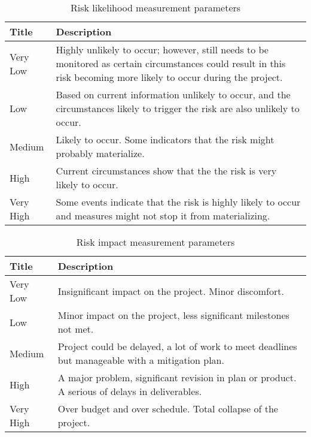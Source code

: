 \begin{center}
    \begin{table}[htb]
    \begin{tabular}{ | l | p{10cm} |}

    \hline
    Title & Description  \\ \hline \hline
    Very Low & Highly unlikely to occur; however, still needs to be monitored as certain circumstances could result
    in this risk becoming more likely to occur during the project. \\ \hline
    Low & Based on current information unlikely to occur, and the circumstances likely to trigger the risk are also unlikely to occur. \\ \hline
    Medium & Likely to occur. Some indicators that the risk might probably materialize.  \\ \hline
    High & Current circumstances show that the the risk is very likely to occur. \\ \hline
    Very High & Some events indicate that the risk is highly likely to occur and measures might not stop it from materializing.\\ \hline
    \end{tabular}
    \caption{Risk likelihood measurement parameters}
    \label{tab:risk-likelihood}
    \end{table}

    \begin{table}[htb]
    \begin{tabular}{|l|p{10cm}|}
    \hline
    Title & Description \\ \hline \hline
    Very Low & Insignificant impact on the project. Minor discomfort. \\ \hline
    Low & Minor impact on the project, less significant milestones not met. \\ \hline
    Medium & Project could be delayed, a lot of work to meet deadlines but manageable with a mitigation plan. \\ \hline
    High & A major problem, significant revision in plan or product. A serious of delays in deliverables.\\ \hline
    Very High & Over budget and over schedule. Total collapse of the project. \\ \hline
    \end{tabular}
    \caption{Risk impact measurement parameters}
    \label{tab:risk-impact}
    \end{table}
\end{center}
